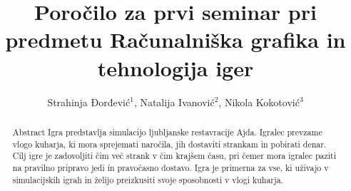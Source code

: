\documentclass[a4paper]{article}
\begin{document}
\title{Poročilo za prvi seminar pri predmetu Računalniška grafika in tehnologija iger}

\author{Strahinja Đorđević$^{1}$, Natalija Ivanović$^{2}$, Nikola Kokotović$^{3}$ }



\maketitle


\begin{abstract}{Abstract}
Igra predstavlja simulacijo ljubljanske restavracije Ajda. 
Igralec prevzame vlogo kuharja, ki mora sprejemati naročila, jih dostaviti strankam in pobirati denar.
Cilj igre je zadovoljiti čim več strank v čim krajšem času, pri čemer mora igralec paziti na pravilno pripravo jedi in pravočasno dostavo.  
Igra je primerna za vse, ki uživajo v simulacijskih igrah in želijo preizkusiti svoje sposobnosti v vlogi kuharja.
\end{abstract}

\begin{comment}
\section*{Navodila}
Ta dokument naj vam služi kot osnova za pisanje poročila o seminarju pri predmetu. Končno poročilo ne sme vsebovati več kot 4 strani besedila (skupaj s slikami lahko več), ne sme pa biti krajše od dveh strani vključno s slikami. Slike vključite v dokument kot kaže primer s sliko \ref{fig:slika} in se nanje tudi sklicujte. Prav tako v besedilu predstavite vsebino slik.

\begin{figure}[!htb]
    \begin{center}
        \texttt{[image: wolfenstein.jpg]}
        \caption{Kratek opis slike.} \label{fig:slika}
    \end{center}
\end{figure}

Pri pisanju poročila vključujte tudi reference na vire s katerimi ste si pomagali pri izdelavi seminarja. To so lahko pisni viri v obliki knjig \cite{Foley1994}, člankov \cite{Meng2015} ali drugih virov, ki jih dodajte med reference, spletne vire pa navajajte v nogi\footnote{\url{https://en.wikipedia.org/wiki/Computer_graphics}}.

Pri izdelavi igre se omejite na izdelavo enega samega nivoja igre, ki pa ga dodelajte in izpilite kolikor vam do\-pu\-šča predviden čas.

\end{comment}
\end{document}

